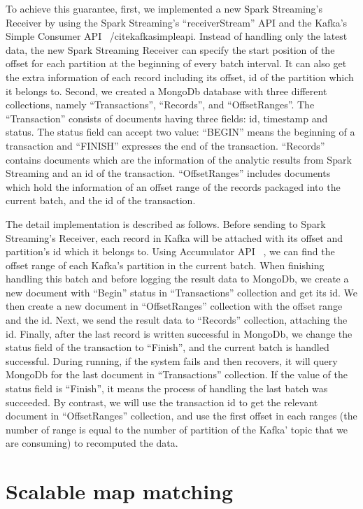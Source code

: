 \documentclass{acm_proc_article-sp}
\begin{document}
To achieve this guarantee, first, we implemented a new Spark Streaming's Receiver by using the Spark Streaming's ``receiverStream'' API and the Kafka's Simple Consumer API ~/cite{kafkasimpleapi}. Instead of handling only the latest data, the new Spark Streaming Receiver can specify the start position of the offset for each partition at the beginning of every batch interval. It can also get the extra information of each record including its offset, id of the partition which it belongs to. Second, we created a MongoDb database with three different collections, namely ``Transactions'', ``Records'', and ``OffsetRanges''. The ``Transaction'' consists of documents having three fields: id, timestamp and status. The status field can accept two value: ``BEGIN'' means the beginning of a transaction and ``FINISH'' expresses the end of the transaction. ``Records'' contains documents which are the information of the analytic results from Spark Streaming and an id of the transaction. ``OffsetRanges'' includes documents which hold the information of an offset range of the records packaged into the current batch, and the id of the transaction.

The detail implementation is described as follows. Before sending to Spark Streaming's Receiver, each record in Kafka will be attached with its offset and partition's id which it belongs to. Using Accumulator API ~\cite{accumulatorapi}, we can find the offset range of each Kafka's partition in the current batch. When finishing handling this batch and before logging the result data to MongoDb, we create a new document with ``Begin'' status in ``Transactions'' collection and get its id. We then create a new document in ``OffsetRanges'' collection with the offset range and the id. Next, we send the result data to ``Records'' collection, attaching the id. Finally, after the last record is written successful in MongoDb, we change the status field of the transaction to ``Finish'', and the current batch is handled successful. During running, if the system fails and then recovers, it will query MongoDb for the last document in ``Transactions'' collection.  If the value of the status field is ``Finish'', it means the process of handling the last batch was succeeded. By contrast, we will use the transaction id to get the relevant document in ``OffsetRanges'' collection, and use the first offset in each ranges (the number of range is equal to the number of partition of the Kafka' topic that we are consuming) to recomputed the data. 

\section{Scalable map matching}
\end{document}
